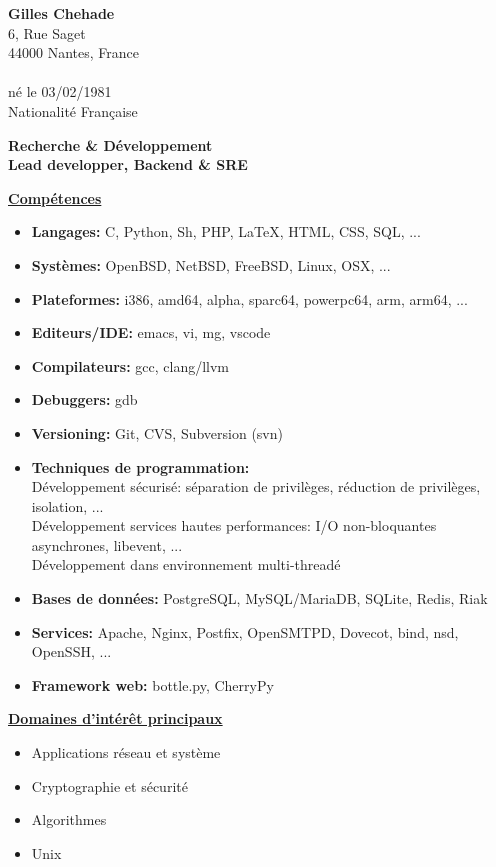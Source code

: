 \documentclass[a4paper,10pt]{letter}
\begin{document}
\textbf{Gilles Chehade}\\
6, Rue Saget\\
44000 Nantes, France\\
\\
n\'e le 03/02/1981\\
Nationalit\'e Fran\c caise\\

\begin{center}
  \large
  \textbf {
    Recherche \& D\'eveloppement\\
    Lead developper, Backend \& SRE\\
  }
\end{center}

\normalsize

\underline{\textbf{Comp\'etences}}\\
\begin{itemize}
\item	\textbf{Langages:}
  C, Python, Sh, PHP, \LaTeX, HTML, CSS, SQL, ...
\item	\textbf{Syst\`emes:}
  OpenBSD, NetBSD, FreeBSD, Linux, OSX, ...
\item	\textbf{Plateformes:}
  i386, amd64, alpha, sparc64, powerpc64, arm, arm64, ...
\item	\textbf{Editeurs/IDE:}
  emacs, vi, mg, vscode
\item	\textbf{Compilateurs:}
  gcc, clang/llvm
\item	\textbf{Debuggers:}
  gdb
\item	\textbf{Versioning:}
  Git, CVS, Subversion (svn)
\item	\textbf{Techniques de programmation:}\\
  D\'eveloppement s\'ecuris\'e: s\'eparation de
  privil\`eges, r\'eduction de privil\`eges, isolation, ...\\
  D\'eveloppement services hautes performances:
  I/O non-bloquantes asynchrones, libevent, ...\\
  D\'eveloppement dans environnement multi-thread\'e
\item	\textbf{Bases de donn\'ees:}
  PostgreSQL, MySQL/MariaDB, SQLite, Redis, Riak
\item	\textbf{Services:}
  Apache, Nginx, Postfix, OpenSMTPD, Dovecot, bind, nsd, OpenSSH, ...
\item	\textbf{Framework web:}
  bottle.py, CherryPy\\
\end{itemize}

\underline{\textbf{Domaines d'int\'er\^et principaux}}\\
\begin{itemize}
\item Applications r\'eseau et syst\`eme
\item Cryptographie et s\'ecurit\'e
\item Algorithmes
\item Unix\\
\end{itemize}
\end{document}
